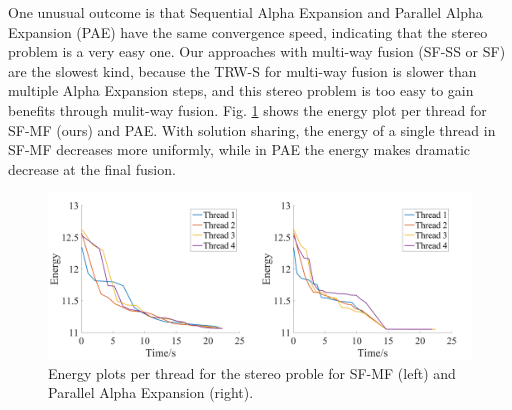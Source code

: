 One unusual outcome is that Sequential Alpha Expansion and Parallel
Alpha Expansion (PAE) have the same convergence speed, indicating that
the stereo problem is a very easy one.
Our approaches with multi-way fusion (SF-SS or SF) are the slowest kind,
because the TRW-S for multi-way fusion is slower than multiple Alpha
Expansion steps, and this stereo problem is too easy to gain benefits
through mulit-way fusion.
%
%
%
%
Fig. \ref{fig:stereo_threads} shows the energy plot per thread for
SF-MF (ours) and PAE. With solution sharing, the energy of a single
thread in SF-MF decreases more uniformly, while in PAE the energy
makes dramatic decrease at the final fusion.
%

\begin{figure}[tb]
\includegraphics[width=\columnwidth]{figure/stereo_threads.png}
\caption{Energy plots per thread for the stereo proble for SF-MF (left) and
Parallel Alpha Expansion (right).
} \label{fig:stereo_threads}
\end{figure}

